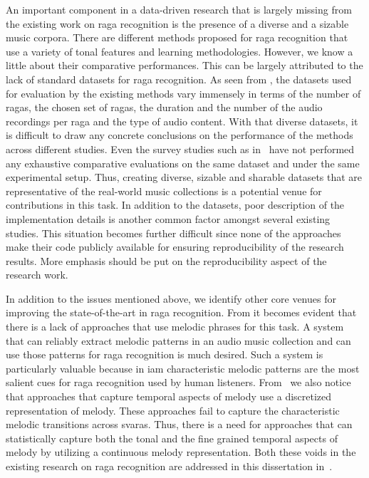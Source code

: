 {An important component in a data-driven research that is largely missing from the existing work on \gls{raga} recognition is the presence of a diverse and a sizable music corpora. There are different methods proposed for \gls{raga} recognition that use a variety of tonal features and learning methodologies. However, we know a little about their comparative performances. This can be largely attributed to the lack of standard datasets for \gls{raga} recognition. As seen from , the datasets used for evaluation by the existing methods vary immensely in terms of the number of \glspl{raga}, the chosen set of \glspl{raga}, the duration and the number of the audio recordings per \gls{raga} and the type of audio content. With that diverse datasets, it is difficult to draw any concrete conclusions on the performance of the methods across different studies. Even the survey studies such as in~\citep{koduri2011survey} have not performed any exhaustive comparative evaluations on the same dataset and under the same experimental setup. Thus, creating diverse, sizable and sharable datasets that are representative of the real-world music collections is a potential venue for contributions in this task. In addition to the datasets, poor description of the implementation details is another common factor amongst several existing studies. This situation becomes further difficult since none of the approaches make their code publicly available for ensuring reproducibility of the research results. More emphasis should be put on the reproducibility aspect of the research work. 


In addition to the issues mentioned above, we identify other core venues for improving the state-of-the-art in \gls{raga} recognition. From  it becomes evident that there is a lack of approaches that use melodic phrases for this task. A system that can reliably extract melodic patterns in an audio music collection and can use those patterns for \gls{raga} recognition is much desired. Such a system is particularly valuable because in \gls{iam} characteristic melodic patterns are the most salient cues for \gls{raga} recognition used by human listeners. From~ we also notice that approaches that capture temporal aspects of melody use a discretized representation of melody. These approaches fail to capture the characteristic melodic transitions across \glspl{svara}. Thus, there is a need for approaches that can statistically capture both the tonal and the fine grained temporal aspects of melody by utilizing a continuous melody representation. Both these voids in the existing research on \gls{raga} recognition are addressed in this dissertation in~.


}
